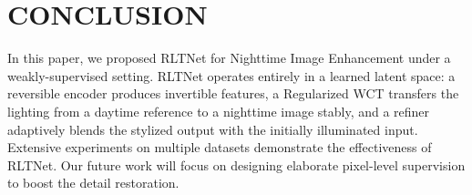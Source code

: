 \documentclass{article}
\begin{document}
\section{CONCLUSION}

In this paper, we proposed RLTNet for Nighttime Image Enhancement under a weakly-supervised setting. RLTNet operates entirely in a learned latent space: a reversible encoder produces invertible features, a Regularized WCT transfers the lighting from a daytime reference to a nighttime image stably, and a refiner adaptively blends the stylized output with the initially illuminated input. Extensive experiments on multiple datasets demonstrate the effectiveness of RLTNet. Our future work will focus on designing elaborate pixel-level supervision
to boost the detail restoration.
\vfill\pagebreak



\end{document}
